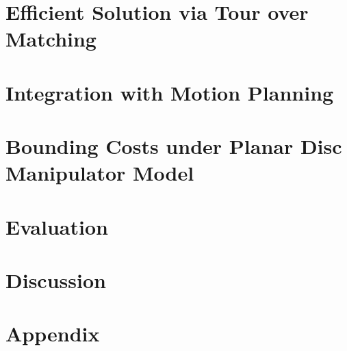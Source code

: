 \documentclass{llncs}
\begin{document}
\section{Efficient Solution via Tour over Matching}
\label{sec:approximation}


\section{Integration with Motion Planning}
\label{sec:integration}


\section{Bounding Costs under Planar Disc Manipulator Model}
\label{sec:cost_bounds}


\section{Evaluation}
\label{sec:evaluation}


\section{Discussion}
\label{sec:discussion}


%
{\small

}

\newpage

\section{Appendix}
\label{sec:appendix}

\end{document}

